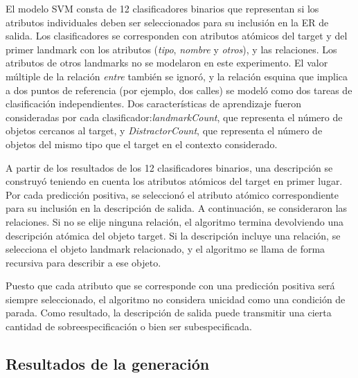 El modelo SVM consta de 12 clasificadores binarios que representan si los atributos individuales deben ser seleccionados para su inclusi\'on en la ER de salida. Los clasificadores se corresponden con atributos at\'omicos del target y del primer landmark con los atributos ({\em tipo}, {\em nombre} y {\em otros}), y las relaciones. Los atributos de otros landmarks no se modelaron en este experimento. El valor m\'ultiple de la relaci\'on {\em entre} tambi\'en se ignor\'o, y la relaci\'on esquina que implica a dos puntos de referencia (por ejemplo, dos calles) se model\'o como dos tareas de clasificaci\'on independientes. Dos caracter\'{i}sticas de aprendizaje fueron consideradas por cada clasificador:{\em landmarkCount}, que representa el n\'umero de objetos cercanos al target, y {\em DistractorCount}, que representa el n\'umero de objetos del mismo tipo que el target en el contexto considerado.

A partir de los resultados de los 12 clasificadores binarios, una descripci\'on se construy\'o teniendo en cuenta los atributos at\'omicos del target en primer lugar. Por cada predicci\'on positiva, se seleccion\'o el atributo at\'omico correspondiente para su inclusi\'on en la descripci\'on de salida. A continuaci\'on, se consideraron las relaciones. Si no se elije ninguna relaci\'on, el algoritmo termina devolviendo una descripci\'on at\'omica del objeto target. Si la descripci\'on incluye una relaci\'on, se selecciona el objeto landmark relacionado, y el algoritmo se llama de forma recursiva para describir a ese objeto.

Puesto que cada atributo que se corresponde con una predicci\'on positiva ser\'a siempre seleccionado, el algoritmo no considera unicidad como una condici\'on de parada. Como resultado, la descripci\'on de salida puede transmitir una cierta cantidad de sobreespecificaci\'on o bien ser subespecificada.


\subsection{Resultados de la generaci\'on }

